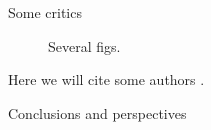 \begin{frame}[t]
\begin{columns}[t]
\begin{column}{\colwidth}
\begin{block}{Some critics}
            \begin{figure}[hbtp]
               \caption{%
                  Several figs.
               }
            \end{figure}
            Here we will cite some authors \cite{westfahl:space,set,stdmodel}.
         \end{block}

            \begin{block}{Conclusions and perspectives}
               \lipsum[5-6]
            \end{block}

            \printbibliography
         \end{column}
         \separatorcolumn
      \end{columns}
\end{frame}


